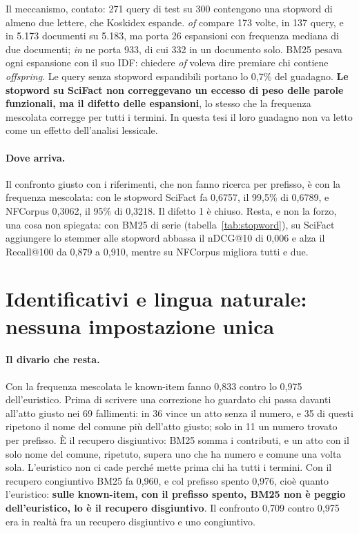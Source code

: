 Il meccanismo, contato: 271 query di test su 300 contengono una stopword di
almeno due lettere, che Koskidex espande. \emph{of} compare 173 volte, in 137 query, e in
5.173 documenti su 5.183, ma porta 26 espansioni con frequenza mediana di due
documenti; \emph{in} ne porta 933, di cui 332 in un documento solo. BM25 pesava
ogni espansione con il suo IDF: chiedere \emph{of} voleva dire premiare chi
contiene \emph{offspring}. Le query senza stopword espandibili portano lo 0,7\%
del guadagno. \textbf{Le stopword su SciFact non correggevano un eccesso di peso
delle parole funzionali, ma il difetto delle espansioni}, lo stesso che la
frequenza mescolata corregge per tutti i termini. In questa tesi il loro guadagno
non va letto come un effetto dell'analisi lessicale.

\paragraph{Dove arriva.} Il confronto giusto con i riferimenti, che non fanno
ricerca per prefisso, è con la frequenza mescolata: con le stopword SciFact fa
0,6757, il 99,5\% di 0,6789, e NFCorpus 0,3062, il 95\% di 0,3218. Il difetto 1 è
chiuso. Resta, e non la forzo, una cosa non spiegata: con BM25 di serie
(tabella~\ref{tab:stopword}), su SciFact aggiungere lo stemmer alle stopword abbassa il nDCG@10 di 0,006 e alza il Recall@100 da 0,879
a 0,910, mentre su NFCorpus migliora tutti e due.

\section{Identificativi e lingua naturale: nessuna impostazione unica}\label{sec:nessuna-unica}

\paragraph{Il divario che resta.} Con la frequenza mescolata le known-item fanno
0,833 contro lo 0,975 dell'euristico. Prima di scrivere una correzione ho guardato
chi passa davanti all'atto giusto nei 69 fallimenti: in 36 vince un atto senza il
numero, e 35 di questi ripetono il nome del comune più dell'atto giusto; solo in
11 un numero trovato per prefisso. È il recupero disgiuntivo: BM25 somma i
contributi, e un atto con il solo nome del comune, ripetuto, supera uno che ha
numero e comune una volta sola. L'euristico non ci cade perché mette prima chi ha
tutti i termini. Con il recupero congiuntivo BM25 fa 0,960, e col prefisso spento
0,976, cioè quanto l'euristico: \textbf{sulle known-item, con il prefisso spento, BM25 non è peggio
dell'euristico, lo è il recupero disgiuntivo}. Il confronto 0,709 contro 0,975
era in realtà fra un recupero disgiuntivo e uno congiuntivo.

